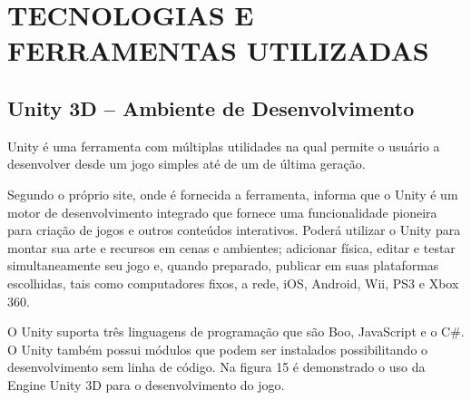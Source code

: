 \chapter{TECNOLOGIAS E FERRAMENTAS UTILIZADAS}
\label{cap:TECNOLOGIAS-E-FERRAMENTAS-UTILIZADAS}


\section{Unity 3D – Ambiente de Desenvolvimento}
\label{sec:Unity-3D---Ambiente-de-Desenvolvimento}

Unity é uma ferramenta com múltiplas utilidades na qual permite o usuário a desenvolver desde um jogo simples até de um de última geração.

Segundo o próprio site, onde é fornecida a ferramenta, informa que o Unity é um motor de desenvolvimento integrado que fornece uma funcionalidade pioneira para criação de jogos e outros conteúdos interativos. Poderá utilizar o Unity para montar sua arte e recursos em cenas e ambientes; adicionar física, editar e testar simultaneamente seu jogo e, quando preparado, publicar em suas plataformas escolhidas, tais como computadores fixos, a rede, iOS, Android, Wii, PS3 e Xbox 360. 

O Unity suporta três linguagens de programação que são Boo, JavaScript e o C\#. O Unity também possui módulos que podem ser instalados possibilitando o desenvolvimento sem linha de código. \cite{unt}
Na figura 15 é demonstrado o uso da Engine Unity 3D para o desenvolvimento do jogo. 



	\begin{figure}[h!]
		\centering
	\end{figure}
	
